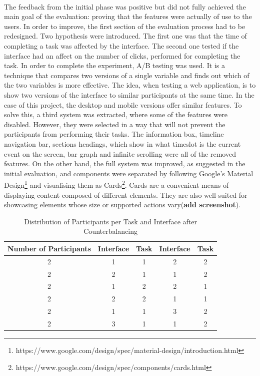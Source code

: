 \documentclass{l4proj}
\begin{document}
\paragraph{}
The feedback from the initial phase was positive but did not fully achieved the main goal of the evaluation: proving that the features were actually of use to the users. In order to improve, the first section of the evaluation process had to be redesigned. Two hypothesis were introduced. The first one was that the time of completing a task was affected by the interface. The second one tested if the interface had an affect on the number of clicks, performed for completing the task. In order to complete the experiment, A/B testing was used. It is a technique that compares two versions of a single variable and finds out which of the two variables is more effective. The idea, when testing a web application, is to show two versions of the interface to similar participants at the same time. In the case of this project, the desktop and mobile versions offer similar features. To solve this, a third system was extracted, where some of the features were disabled. However, they were selected in a way that will not prevent the participants from performing their tasks. The information box, timeline navigation bar, sections headings, which show in what timeslot is the current event on the screen, bar graph and infinite scrolling were all of the removed features. On the other hand, the full system was improved, as suggested in the initial evaluation, and components were separated by following Google's Material Design\footnote{https://www.google.com/design/spec/material-design/introduction.html} and visualising them as Cards\footnote{https://www.google.com/design/spec/components/cards.html}. Cards are a convenient means of displaying content composed of different elements. They are also well-suited for showcasing elements whose size or supported actions vary(\textbf{add screenshot}).

\begin{table}[H]
	\centering
	\begin{tabular}{|c|c|c|c|c|} \hline
		Number of Participants&	Interface & Task &	Interface & Task \\ \hline
		2 	& 1	& 1	& 2 & 2  \\ \hline
		2	& 2	& 1	& 1 & 2  \\ \hline
		2 	& 1	& 2	& 2 & 1  \\ \hline
		2	& 2	& 2 & 1 & 1  \\ \hline
		2 	& 1	& 1	& 3 & 2  \\ \hline
		2	& 3	& 1	& 1 & 2  \\ \hline
	\end{tabular}
	\caption{Distribution of Participants per Task and Interface after Counterbalancing}
	\label{tab:counterbalancing}
\end{table}
\end{document}
